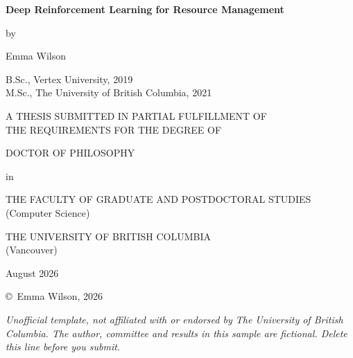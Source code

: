 \begin{titlepage}
\centering
\begin{singlespace}
\vspace*{0.4in}
{\large\bfseries Deep Reinforcement Learning for Resource Management\par}
\vspace{0.5in}
by\par
\vspace{0.2in}
Emma Wilson\par
\vspace{0.1in}
B.Sc., Vertex University, 2019\\
M.Sc., The University of British Columbia, 2021\par
\vspace{0.5in}
A THESIS SUBMITTED IN PARTIAL FULFILLMENT OF\\
THE REQUIREMENTS FOR THE DEGREE OF\par
\vspace{0.2in}
DOCTOR OF PHILOSOPHY\par
\vspace{0.2in}
in\par
\vspace{0.2in}
THE FACULTY OF GRADUATE AND POSTDOCTORAL STUDIES\\
(Computer Science)\par
\vspace{0.4in}
THE UNIVERSITY OF BRITISH COLUMBIA\\
(Vancouver)\par
\vspace{0.3in}
August 2026\par
\vspace{0.3in}
\copyright\ Emma Wilson, 2026
\end{singlespace}
\vfill
{\footnotesize\itshape Unofficial template, not affiliated with or endorsed by The University of British Columbia. The author, committee and results in this sample are fictional. Delete this line before you submit.}
\end{titlepage}

